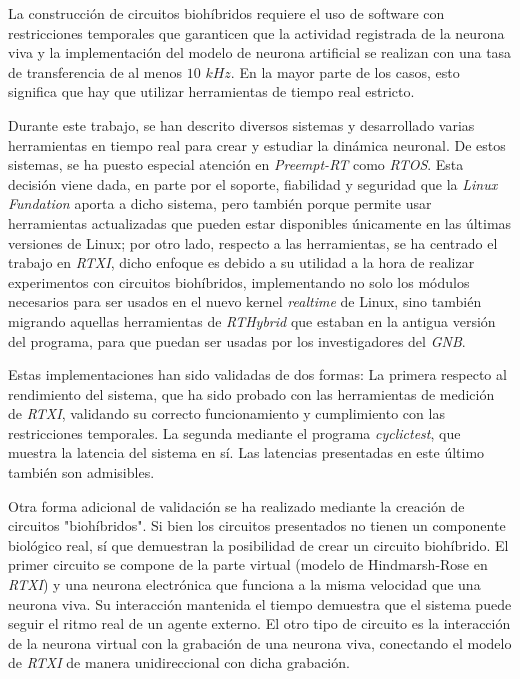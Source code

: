 
La construcción de circuitos biohíbridos requiere el uso de software con restricciones temporales que garanticen que la actividad registrada de la neurona viva y la implementación del modelo de neurona artificial se realizan con una tasa de transferencia de al menos $10$ $kHz$. En la mayor parte de los casos, esto significa que hay que utilizar herramientas de tiempo real estricto.

Durante este trabajo, se han descrito diversos sistemas y desarrollado varias herramientas en tiempo real para crear y estudiar la dinámica neuronal. De estos sistemas, se ha puesto especial atención en \textit{Preempt-RT} como \textit{RTOS}. Esta decisión viene dada, en parte por el soporte, fiabilidad y seguridad que la \textit{Linux Fundation} aporta a dicho sistema, pero también porque permite usar herramientas actualizadas que pueden estar disponibles únicamente en las últimas versiones de Linux; por otro lado, respecto a las herramientas, se ha centrado el trabajo en \textit{RTXI}, dicho enfoque es debido a su utilidad a la hora de realizar experimentos con circuitos biohíbridos, implementando no solo los módulos necesarios para ser usados en el nuevo kernel \textit{realtime} de Linux, sino también migrando aquellas herramientas de \textit{RTHybrid} que estaban en la antigua versión del programa, para que puedan ser usadas por los investigadores del \textit{GNB}.

Estas implementaciones han sido validadas de dos formas: La primera respecto al rendimiento del sistema, que ha sido probado con las herramientas de medición de \textit{RTXI}, validando su correcto funcionamiento y cumplimiento con las restricciones temporales. La segunda mediante el programa \textit{cyclictest}, que muestra la latencia del sistema en sí. Las latencias presentadas en este último también son admisibles.

Otra forma adicional de validación se ha realizado mediante la creación de circuitos "biohíbridos". Si bien los circuitos presentados no tienen un componente biológico real, sí que demuestran la posibilidad de crear un circuito biohíbrido. El primer circuito se compone de la parte virtual (modelo de Hindmarsh-Rose en \textit{RTXI}) y una neurona electrónica que funciona a la misma velocidad que una neurona viva. Su interacción mantenida el tiempo demuestra que el sistema puede seguir el ritmo real de un agente externo. El otro tipo de circuito es la interacción de la neurona virtual con la grabación de una neurona viva, conectando el modelo de \textit{RTXI} de manera unidireccional con dicha grabación.

